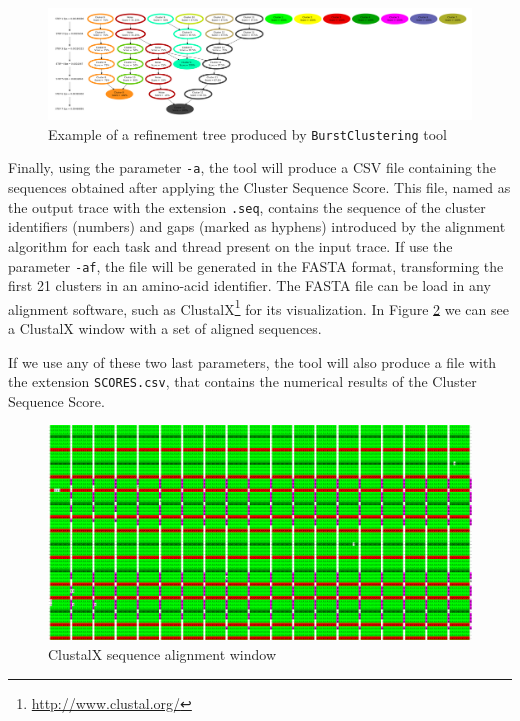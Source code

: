 \documentclass[a4paper, 12pt]{article}
\begin{document}
\begin{figure}
  
  \centering
  \includegraphics[width=1\columnwidth]{refinement_tree/refinement_tree.pdf}
  \caption{Example of a refinement tree produced by \texttt{BurstClustering} tool}
  \label{fig:refinement_tree}

\end{figure}

Finally, using the parameter \texttt{-a}, the tool will produce a CSV file
containing the sequences obtained after applying the Cluster Sequence Score.
This file, named as the output trace with the extension \texttt{.seq}, contains
the sequence of the cluster identifiers (numbers) and gaps (marked as hyphens)
introduced by the alignment algorithm for each task and thread present on
the input trace. If use the parameter \texttt{-af}, the file will be generated
in the FASTA format, transforming the first 21 clusters in an amino-acid 
identifier. The FASTA file can be load in any alignment software, such
as ClustalX\footnote{\url{http://www.clustal.org/}} for its visualization. In
Figure \ref{fig:clustalx_example} we can see a ClustalX window with a set of
aligned sequences.

If we use any of these two last parameters, the tool will also produce a file
with the extension \texttt{SCORES.csv}, that contains the numerical results of
the Cluster Sequence Score. 

\begin{figure}
  \centering
  
  \includegraphics[width=1\columnwidth]{sequences_example/sequences_clustalx.png}
 
  \caption{ClustalX sequence alignment window}
  \label{fig:clustalx_example}
\end{figure}
\end{document}
